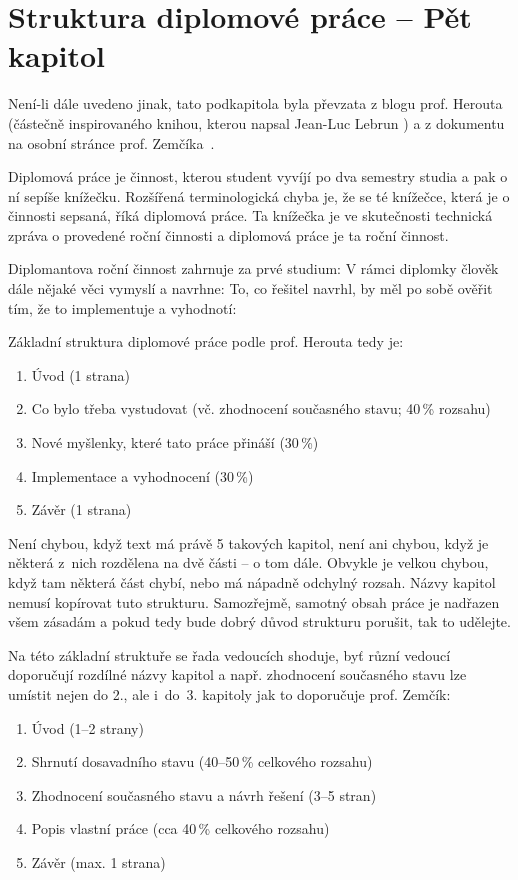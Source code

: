 \section{Struktura diplomové práce -- Pět kapitol}
Není-li dále uvedeno jinak, tato podkapitola byla převzata z blogu prof. Herouta \cite{Herout} (částečně inspirovaného knihou, kterou napsal Jean-Luc Lebrun \cite{Lebrun2011}) a z dokumentu na osobní stránce prof. Zemčíka~\cite{Zemcik}.
\bigskip

Diplomová práce je činnost, kterou student vyvíjí po dva semestry studia a pak o ní sepíše knížečku. Rozšířená terminologická chyba je, že se té knížečce, která je o činnosti sepsaná, říká diplomová práce. Ta knížečka je ve skutečnosti technická zpráva o provedené roční činnosti a diplomová práce je ta roční činnost.

Diplomantova roční činnost zahrnuje za prvé studium:  V rámci diplomky člověk dále nějaké věci vymyslí a navrhne:  To, co řešitel navrhl, by měl po sobě ověřit tím, že to implementuje a vyhodnotí: 

Základní struktura diplomové práce podle prof. Herouta tedy je:
\begin{enumerate}
  \item{Úvod (1 strana)}
  \item{Co bylo třeba vystudovat (vč. zhodnocení současného stavu; 40\,\% rozsahu)}
  \item{Nové myšlenky, které tato práce přináší (30\,\%)}
  \item{Implementace a vyhodnocení (30\,\%)}
  \item{Závěr (1 strana)}
\end{enumerate}

Není chybou, když text má právě 5 takových kapitol, není ani chybou, když je některá z~nich rozdělena na dvě části -- o tom dále. Obvykle je velkou chybou, když tam některá část chybí, nebo má nápadně odchylný rozsah. Názvy kapitol nemusí kopírovat tuto strukturu. Samozřejmě, samotný obsah práce je nadřazen všem zásadám a pokud tedy bude dobrý důvod strukturu porušit, tak to udělejte.

Na této základní struktuře se řada vedoucích shoduje, byť různí vedoucí doporučují rozdílné názvy kapitol a např. zhodnocení současného stavu lze umístit nejen do 2., ale i~do~3. kapitoly jak to doporučuje prof. Zemčík:
\begin{enumerate}
  \item{Úvod (1--2 strany)}
  \item{Shrnutí dosavadního stavu (40--50\,\% celkového rozsahu)}
  \item{Zhodnocení současného stavu a návrh řešení (3--5 stran)}
  \item{Popis vlastní práce (cca 40\,\% celkového rozsahu)}
  \item{Závěr (max. 1 strana)}
\end{enumerate}

